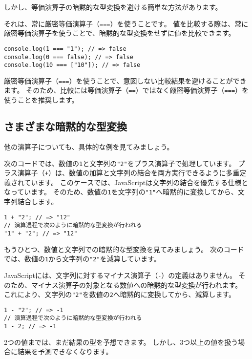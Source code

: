しかし、等価演算子の暗黙的な型変換を避ける簡単な方法があります。

それは、常に厳密等価演算子（\texttt{===}）を使うことです。
値を比較する際は、常に厳密等価演算子を使うことで、暗黙的な型変換をせずに値を比較できます。

\begin{lstlisting}
console.log(1 === "1"); // => false
console.log(0 === false); // => false
console.log(10 === ["10"]); // => false
\end{lstlisting}

厳密等価演算子（\texttt{===}）を使うことで、意図しない比較結果を避けることができます。
そのため、比較には等価演算子（\texttt{==}）ではなく厳密等価演算子（\texttt{===}）を使うことを推奨します。

\hypertarget{various-implicit-coercion}{%
\subsection{さまざまな暗黙的な型変換}\label{various-implicit-coercion}}

他の演算子についても、具体的な例を見てみましょう。

次のコードでは、数値の\texttt{1}と文字列の\texttt{"2"}をプラス演算子で処理しています。
プラス演算子（\texttt{+}）は、数値の加算と文字列の結合を両方実行できるように多重定義されています。
このケースでは、JavaScriptは文字列の結合を優先する仕様となっています。
そのため、数値の\texttt{1}を文字列の\texttt{"1"}へ暗黙的に変換してから、文字列結合します。

\begin{lstlisting}
1 + "2"; // => "12"
// 演算過程で次のように暗黙的な型変換が行われる
"1" + "2"; // => "12"
\end{lstlisting}

もうひとつ、数値と文字列での暗黙的な型変換を見てみましょう。
次のコードでは、数値の\texttt{1}から文字列の\texttt{"2"}を減算しています。

JavaScriptには、文字列に対するマイナス演算子（\texttt{-}）の定義はありません。
そのため、マイナス演算子の対象となる数値への暗黙的な型変換が行われます。
これにより、文字列の\texttt{"2"}を数値の\texttt{2}へ暗黙的に変換してから、減算します。

\begin{lstlisting}
1 - "2"; // => -1
// 演算過程で次のように暗黙的な型変換が行われる
1 - 2; // => -1
\end{lstlisting}

2つの値までは、まだ結果の型を予想できます。
しかし、3つ以上の値を扱う場合に結果を予測できなくなります。

